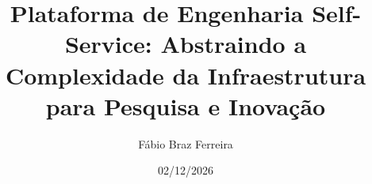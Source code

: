 \documentclass[oneside, 12pt]{book}
\title{Plataforma de Engenharia Self-Service: Abstraindo a Complexidade da Infraestrutura para Pesquisa e Inovação}
\author{Fábio Braz Ferreira}
\date{02/12/2026}
\makeatletter
\newcommand{\secmark}[2]{#2}
\newcommand{\headsecnum}{{\let\secmark\@firstoftwo\rightmark}}
\newcommand{\headsectitle}{{\let\secmark\@secondoftwo\rightmark}}
\makeatother
\begin{document}
	\frontmatter
    \renewcommand{\refname}{Referências}%
    \renewcommand{\bibname}{Referências}%
	
	\setcounter{tocdepth}{2}
	\fancyhead[RO]{{\footnotesize\headsectitle}\hspace{2em}\thepage}
	
	
	\newpage
	
	\newpage
    
    \newpage

	
	
	
	
	
	

    \listoffigures		
	\listoftables
    \renewcommand\contentsname{\centering Sumário} 
	\tableofcontents
	
	
	\mainmatter	
	\fancyhead[LO]{\headsecnum}
	
	\onehalfspacing            %
	
	\setcounter{page}{1}
	
	
	
	
	
	
	
	
	
	\fancyhead[RO]{\thepage}
	\fancyhead[LO]{}
    \printbibliography[heading=bibintoc]
    \clearpage
    
    \fancyhead[LO]{\MakeUppercase{\appendixname}\,\thechapter}
	\begin{appendix}
	    
	\end{appendix}
	
\end{document}
